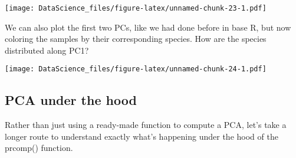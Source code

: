 \documentclass[
]{book}
\newenvironment{Shaded}{\begin{snugshade}}{\end{snugshade}}
\newcommand{\DataTypeTok}[1]{\textcolor[rgb]{0.13,0.29,0.53}{#1}}
\newcommand{\DecValTok}[1]{\textcolor[rgb]{0.00,0.00,0.81}{#1}}
\newcommand{\KeywordTok}[1]{\textcolor[rgb]{0.13,0.29,0.53}{\textbf{#1}}}
\newcommand{\NormalTok}[1]{#1}
\newcommand{\OperatorTok}[1]{\textcolor[rgb]{0.81,0.36,0.00}{\textbf{#1}}}
\newcommand{\StringTok}[1]{\textcolor[rgb]{0.31,0.60,0.02}{#1}}
\begin{document}
\begin{Shaded}
\end{Shaded}

\texttt{[image: DataScience\_files/figure-latex/unnamed-chunk-23-1.pdf]}

We can also plot the first two PCs, like we had done before in base R, but now coloring the samples by their corresponding species. How are the species distributed along PC1?

\begin{Shaded}
\end{Shaded}

\texttt{[image: DataScience\_files/figure-latex/unnamed-chunk-24-1.pdf]}

\hypertarget{pca-under-the-hood}{%
\subsection{PCA under the hood}\label{pca-under-the-hood}}

Rather than just using a ready-made function to compute a PCA, let's take a longer route to understand exactly what's happening under the hood of the prcomp() function.
\end{document}
